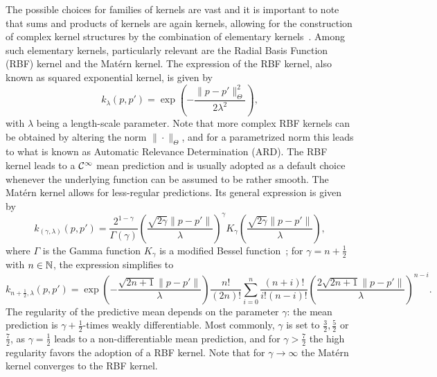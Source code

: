 The possible choices for families of kernels are vast and it is important to note that sums and products of kernels are again kernels, allowing for the construction of complex kernel structures by the combination of elementary kernels~\cite{Duvenaud}.
Among such elementary kernels, particularly relevant are the Radial Basis Function (RBF) kernel and the Matérn kernel. \newline
The expression of the RBF kernel, also known as squared exponential kernel, is given by
\[
k_{\lambda}(p, p') = \exp\left(-\frac{\|p - p'\|_\Theta^2}{2\lambda^2}\right),
\]
with $\lambda$ being a length-scale parameter. 
Note that more complex RBF kernels can be obtained by altering the norm $\| \cdot \|_\Theta$, and for a parametrized norm this leads to what is known as Automatic Relevance Determination (ARD).
The RBF kernel leads to a $\mathcal C^\infty$ mean prediction and is usually adopted as a default choice whenever the underlying function can be assumed to be rather smooth. \newline
The Matérn kernel allows for less-regular predictions. Its general expression is given by
\[
k_{(\gamma, \lambda)}(p, p') = \frac{2^{1-\gamma}}{\Gamma(\gamma)} \left( \frac{\sqrt{2\gamma} \|p - p'\|}{\lambda} \right)^\gamma K_\gamma \left( \frac{\sqrt{2\gamma} \|p - p'\|}{\lambda} \right),
\]
where $\Gamma$ is the Gamma function $K_\gamma$ is a modified Bessel function~\cite[sec. 9.6]{AbramowitzStegun1964};
for $\gamma = n + \frac{1}{2}$ with $n\in \mathbb N$, the expression simplifies to 
\[
     k_{n+\frac{1}{2}, \lambda}(p, p')=\exp \left(-{\frac {{\sqrt {2n+1}}\|p - p'\|}{\lambda }}\right){\frac {n!}{(2n)!}}\sum _{i=0}^{n}{\frac {(n+i)!}{i!(n-i)!}}\left({\frac {2{\sqrt {2n+1}}\|p - p'\|}{\lambda }}\right)^{n-i}.
\]
The regularity of the predictive mean depends on the parameter $\gamma$: the mean prediction is $\gamma + \frac{1}{2}$-times weakly differentiable.
Most commonly, $\gamma$ is set to $\frac{3}{2}, \frac{5}{2}$ or $\frac{7}{2}$, as $\gamma = \frac{1}{2}$ leads to a non-differentiable mean prediction, and for $\gamma > \frac{7}{2}$ the high regularity favors the adoption of a RBF kernel.
Note that for $\gamma \rightarrow \infty$ the Matérn kernel converges to the RBF kernel. \medbreak

